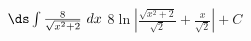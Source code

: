 {$\ds \int \frac8{\sqrt{x^2+2}}\ dx$
}
{$8\ln\left|\frac{\sqrt{x^2+2}}{\sqrt{2}}+\frac x{\sqrt{2}}\right|+C$%
}